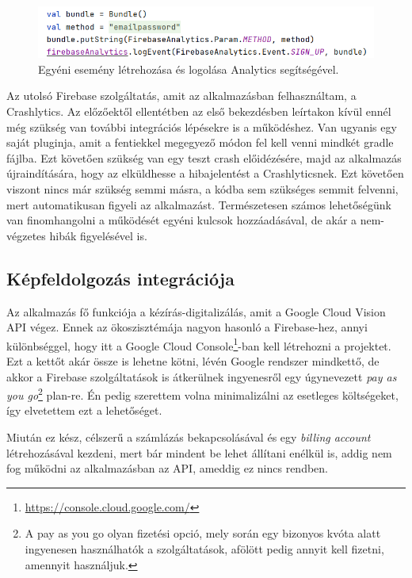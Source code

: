 \begin{figure}[!ht]
	\centering
	\includegraphics[width=120mm, keepaspectratio]{figures/analytics_custom.png}
	\caption{Egyéni esemény létrehozása és logolása Analytics segítségével.}
	\label{fig:Analytics}
\end{figure}

Az utolsó Firebase szolgáltatás, amit az alkalmazásban felhasználtam, a Crashlytics. Az előzőektől ellentétben az első bekezdésben leírtakon kívül ennél még szükség van további integrációs lépésekre is a működéshez. Van ugyanis egy saját pluginja, amit a fentiekkel megegyező módon fel kell venni mindkét gradle fájlba. Ezt követően szükség van egy teszt crash előidézésére, majd az alkalmazás újraindítására, hogy az elküldhesse a hibajelentést a Crashlyticsnek. Ezt követően viszont nincs már szükség semmi másra, a kódba sem szükséges semmit felvenni, mert automatikusan figyeli az alkalmazást. Természetesen számos lehetőségünk van finomhangolni a működését egyéni kulcsok hozzáadásával, de akár a nem-végzetes hibák figyelésével is.

\subsection{Képfeldolgozás integrációja}
Az alkalmazás fő funkciója a kézírás-digitalizálás, amit a Google Cloud Vision API végez. Ennek az ökoszisztémája nagyon hasonló a Firebase-hez, annyi különbséggel, hogy itt a Google Cloud Console\footnote{\url{https://console.cloud.google.com/}}-ban kell létrehozni a projektet. Ezt a kettőt akár össze is lehetne kötni, lévén Google rendszer mindkettő, de akkor a Firebase szolgáltatások is átkerülnek ingyenesről egy úgynevezett \emph{pay as you go}\footnote{A pay as you go olyan fizetési opció, mely során egy bizonyos kvóta alatt ingyenesen használhatók a szolgáltatások, afölött pedig annyit kell fizetni, amennyit használjuk.} plan-re. Én pedig szerettem volna minimalizálni az esetleges költségeket, így elvetettem ezt a lehetőséget.
	
Miután ez kész, célszerű a számlázás bekapcsolásával és egy \emph{billing account} létrehozásával kezdeni, mert bár mindent be lehet állítani enélkül is, addig nem fog működni az alkalmazásban az API, ameddig ez nincs rendben.

